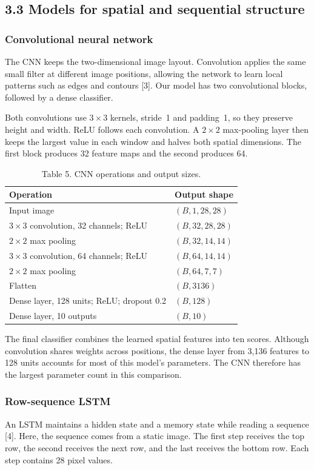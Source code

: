 \subsection{3.3 Models for spatial and sequential structure}
\subsubsection{Convolutional neural network}
The CNN keeps the two-dimensional image layout. Convolution applies the same
small filter at different image positions, allowing the network to learn local
patterns such as edges and contours [3]. Our model has two
convolutional blocks, followed by a dense classifier.

Both convolutions use $3\times3$ kernels, stride~1 and padding~1, so they preserve
height and width. ReLU follows each convolution. A $2\times2$ max-pooling layer
then keeps the largest value in each window and halves both spatial dimensions.
The first block produces 32 feature maps and the second produces 64.

\begin{table}[h]
\centering
\caption{Table 5. CNN operations and output sizes.}
\label{tab:fresh_cnn}
\begin{tabularx}{\linewidth}{X l}
\toprule
Operation & Output shape\\
\midrule
Input image & $(B,1,28,28)$\\
$3\times3$ convolution, 32 channels; ReLU & $(B,32,28,28)$\\
$2\times2$ max pooling & $(B,32,14,14)$\\
$3\times3$ convolution, 64 channels; ReLU & $(B,64,14,14)$\\
$2\times2$ max pooling & $(B,64,7,7)$\\
Flatten & $(B,3136)$\\
Dense layer, 128 units; ReLU; dropout 0.2 & $(B,128)$\\
Dense layer, 10 outputs & $(B,10)$\\
\bottomrule
\end{tabularx}
\end{table}

The final classifier combines the learned spatial features into ten scores.
Although convolution shares weights across positions, the dense layer from
3,136 features to 128 units accounts for most of this model's parameters.
The CNN therefore has the largest parameter count in this comparison.

\subsubsection{Row-sequence LSTM}
An LSTM maintains a hidden state and a memory state while reading a sequence
[4]. Here, the sequence comes from a static image. The first step
receives the top row, the second receives the next row, and the last receives
the bottom row. Each step contains 28 pixel values.

